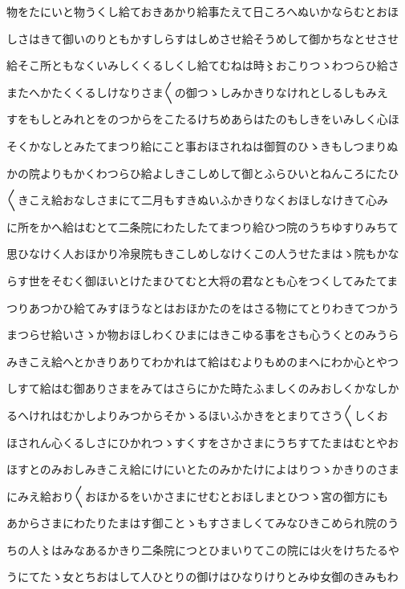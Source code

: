 \documentclass[a4paper,11pt,landscape]{ltjtarticle}
\begin{document}
物をたにいと物うくし給ておきあかり給事たえて日ころへぬいかならむとおほ
\par\medskip
しさはきて御いのりともかすしらすはしめさせ給そうめして御かちなとせさせ
\par\medskip
給そこ所ともなくいみしくくるしくし給てむねは時〻おこりつゝわつらひ給さ
\par\medskip
またへかたくくるしけなりさま〱の御つゝしみかきりなけれとしるしもみえ
\par\medskip
すをもしとみれとをのつからをこたるけちめあらはたのもしきをいみしく心ほ
\par\medskip
そくかなしとみたてまつり給にこと事おほされねは御賀のひゝきもしつまりぬ
\par\medskip
かの院よりもかくわつらひ給よしきこしめして御とふらひいとねんころにたひ
\par\medskip
〱きこえ給おなしさまにて二月もすきぬいふかきりなくおほしなけきて心み
\par\medskip
に所をかへ給はむとて二条院にわたしたてまつり給ひつ院のうちゆすりみちて
\par\medskip
思ひなけく人おほかり冷泉院もきこしめしなけくこの人うせたまはゝ院もかな
\par\medskip
らす世をそむく御ほいとけたまひてむと大将の君なとも心をつくしてみたてま
\par\medskip
つりあつかひ給てみすほうなとはおほかたのをはさる物にてとりわきてつかう
\par\medskip
まつらせ給いさゝか物おほしわくひまにはきこゆる事をさも心うくとのみうら
\par\medskip
みきこえ給へとかきりありてわかれはて給はむよりもめのまへにわか心とやつ
\par\medskip
しすて給はむ御ありさまをみてはさらにかた時たふましくのみおしくかなしか
\par\medskip
るへけれはむかしよりみつからそかゝるほいふかきをとまりてさう〱しくお
\par\medskip
ほされん心くるしさにひかれつゝすくすをさかさまにうちすてたまはむとやお
\par\medskip
ほすとのみおしみきこえ給にけにいとたのみかたけによはりつゝかきりのさま
\par\medskip
にみえ給おり〱おほかるをいかさまにせむとおほしまとひつゝ宮の御方にも
\par\medskip
あからさまにわたりたまはす御ことゝもすさましくてみなひきこめられ院のう
\par\medskip
ちの人〻はみなあるかきり二条院につとひまいりてこの院には火をけちたるや
\par\medskip
うにてたゝ女とちおはして人ひとりの御けはひなりけりとみゆ女御のきみもわ
\end{document}
